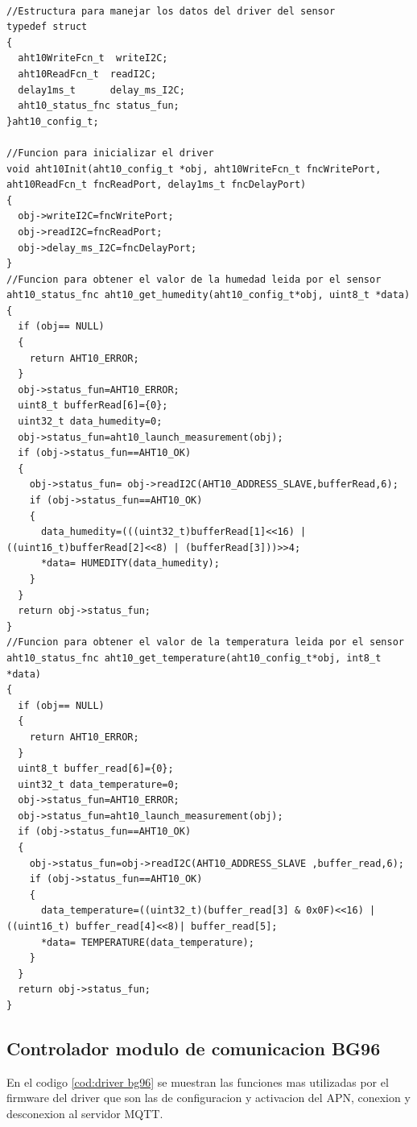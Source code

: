 \begin{lstlisting}[label=cod:codigo AHT10,caption=Funciones principales del driver del sensor AHT10.]  % Start your code-block

//Estructura para manejar los datos del driver del sensor    
typedef struct 
{
  aht10WriteFcn_t  writeI2C;
  aht10ReadFcn_t  readI2C;
  delay1ms_t      delay_ms_I2C;    
  aht10_status_fnc status_fun;
}aht10_config_t;

//Funcion para inicializar el driver 
void aht10Init(aht10_config_t *obj, aht10WriteFcn_t fncWritePort, aht10ReadFcn_t fncReadPort, delay1ms_t fncDelayPort)
{
  obj->writeI2C=fncWritePort;
  obj->readI2C=fncReadPort;
  obj->delay_ms_I2C=fncDelayPort;
}
//Funcion para obtener el valor de la humedad leida por el sensor 
aht10_status_fnc aht10_get_humedity(aht10_config_t*obj, uint8_t *data)
{
  if (obj== NULL)
  {
    return AHT10_ERROR;
  }
  obj->status_fun=AHT10_ERROR;
  uint8_t bufferRead[6]={0};
  uint32_t data_humedity=0;
  obj->status_fun=aht10_launch_measurement(obj);
  if (obj->status_fun==AHT10_OK)
  {
    obj->status_fun= obj->readI2C(AHT10_ADDRESS_SLAVE,bufferRead,6);
    if (obj->status_fun==AHT10_OK)
    {
      data_humedity=(((uint32_t)bufferRead[1]<<16) | ((uint16_t)bufferRead[2]<<8) | (bufferRead[3]))>>4;
      *data= HUMEDITY(data_humedity);
    }
  }
  return obj->status_fun;
}
//Funcion para obtener el valor de la temperatura leida por el sensor 
aht10_status_fnc aht10_get_temperature(aht10_config_t*obj, int8_t *data)
{
  if (obj== NULL)
  {
    return AHT10_ERROR;
  } 
  uint8_t buffer_read[6]={0};
  uint32_t data_temperature=0;
  obj->status_fun=AHT10_ERROR;
  obj->status_fun=aht10_launch_measurement(obj);
  if (obj->status_fun==AHT10_OK)
  {
    obj->status_fun=obj->readI2C(AHT10_ADDRESS_SLAVE ,buffer_read,6);
    if (obj->status_fun==AHT10_OK)
    {
      data_temperature=((uint32_t)(buffer_read[3] & 0x0F)<<16) | ((uint16_t) buffer_read[4]<<8)| buffer_read[5];
      *data= TEMPERATURE(data_temperature);
    }
  }
  return obj->status_fun;
}
\end{lstlisting}
\subsection{Controlador modulo de comunicacion BG96 } 
En el codigo \ref{cod:driver bg96} se muestran las funciones mas utilizadas por el firmware del driver que son las de configuracion y activacion del APN, conexion y desconexion al servidor MQTT.

